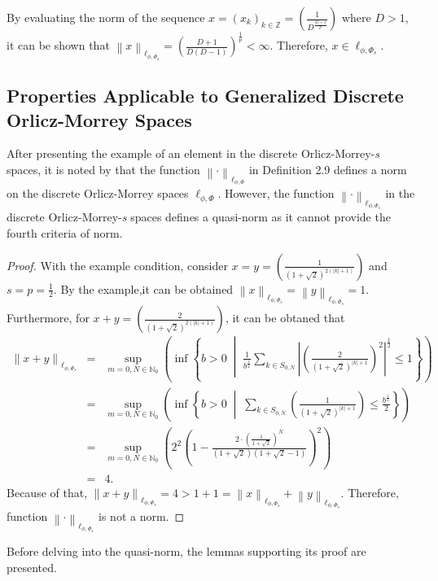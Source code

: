 \documentclass[12pt,a4paper]{article}
\theoremstyle{remark}
\begin{document}
By evaluating the norm of the sequence $x = (x_k)_{k\in\mathbb{Z}} = \left( \frac{1}{D^{\frac{\left|k\right|+1}{p}}} \right)$ where $D>1$, it can be shown that $\left\lVert x\right\rVert _{\ell_{\phi,\Phi_s}} = \left(\frac{D+1}{D\left(D-1\right)}\right)^{\frac{1}{p}} < \infty$. Therefore, $x \in \ell_{\phi,\Phi_s}$.

\subsection{Properties Applicable to Generalized Discrete Orlicz-Morrey Spaces}
After presenting the example of an element in the discrete Orlicz-Morrey-\emph{s} spaces, it is noted by \cite{ref7} that the function $\left\lVert \cdot \right\rVert _{\ell_{\phi,\Phi}}$ in Definition 2.9 defines a norm on the discrete Orlicz-Morrey spaces $\ell_{\phi,\Phi}$. However, the function $\left\lVert \cdot \right\rVert _{\ell_{\phi,\Phi_s}}$ in the discrete Orlicz-Morrey-\emph{s} spaces defines a quasi-norm as it cannot provide the fourth criteria of norm.
\begin{proof}
    With the example condition, consider $x=y=\left( \frac{1}{{\left(1+\sqrt{2}\right)}^{2\left(\left|k\right|+1\right)}} \right)$ and $s=p=\frac{1}{2}$. By the example,it can be obtained $\left\lVert x \right\rVert _{\ell_{\phi, \Phi_s}}=\left\lVert y \right\rVert _{\ell_{\phi, \Phi_s}}=1$. Furthermore, for $x+y=\left( \frac{2}{{\left(1+\sqrt{2}\right)}^{2\left(\left|k\right|+1\right)}} \right)$, it can be obtaned that
    \begin{eqnarray*}
        \left\lVert x+y\right\rVert _{\ell_{\phi,\Phi_s}} &=& \sup_{m=0, N \in \mathbb{N}_0} \left(\inf \left\{ b > 0 \;\middle|\; \frac{1}{b^{\frac{1}{2}}} \sum_{k \in S_{0,N}} {\left|{\left(\frac{2}{\left(1+\sqrt{2}\right)^{\left|k\right|+1}} \right)}^{2}\right|}^{\frac{1}{2}} \leq 1 \right\} \right)\\
        &=& \sup_{m=0, N \in \mathbb{N}_0} \left(\inf \left\{ b > 0 \;\middle|\; \sum_{k \in S_{0,N}} \left(\frac{1}{\left(1+\sqrt{2}\right)^{\left|k\right|+1}}\right) \leq \frac{b^{\frac{1}{2}}}{2} \right\}\right)\\
        &=& \sup_{m=0, N \in \mathbb{N}_0} \left(2^2{\left(1-\frac{2\cdot{\left(\frac{1}{1+\sqrt{2}}\right)}^N}{\left(1+\sqrt{2}\right)\left(1+\sqrt{2}-1\right)}\right)}^2 \right)\\
        &=& 4.
    \end{eqnarray*}
    Because of that, $\left\lVert x+y\right\rVert _{\ell_{\phi,\Phi_s}}=4>1+1=\left\lVert x \right\rVert _{\ell_{\phi, \Phi_s}}+\left\lVert y \right\rVert _{\ell_{\phi, \Phi_s}}$. Therefore, function $\left\lVert \cdot \right\rVert _{\ell_{\phi,\Phi_s}}$ is not a norm.
\end{proof}
Before delving into the quasi-norm, the lemmas supporting its proof are presented.
\end{document}
